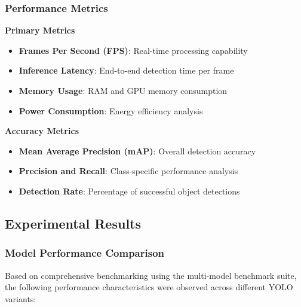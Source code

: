 \documentclass[11pt,a4paper]{article}
\begin{document}
\subsubsection{Performance Metrics}

\textbf{Primary Metrics}
\begin{itemize}
    \item \textbf{Frames Per Second (FPS)}: Real-time processing capability
    \item \textbf{Inference Latency}: End-to-end detection time per frame
    \item \textbf{Memory Usage}: RAM and GPU memory consumption
    \item \textbf{Power Consumption}: Energy efficiency analysis
\end{itemize}

\textbf{Accuracy Metrics}
\begin{itemize}
    \item \textbf{Mean Average Precision (mAP)}: Overall detection accuracy
    \item \textbf{Precision and Recall}: Class-specific performance analysis
    \item \textbf{Detection Rate}: Percentage of successful object detections
\end{itemize}

\subsection{Experimental Results}

\subsubsection{Model Performance Comparison}

Based on comprehensive benchmarking using the multi-model benchmark suite, the following performance characteristics were observed across different YOLO variants:
\end{document}
